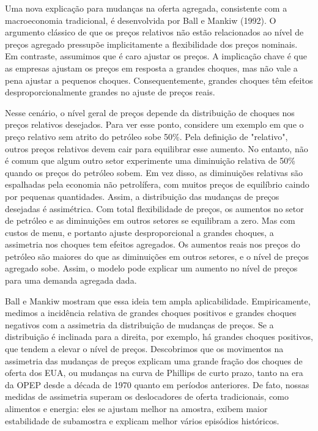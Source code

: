 \documentclass[12pt]{article}
\begin{document}
Uma nova explicação para mudanças na oferta agregada, consistente com a macroeconomia tradicional, é desenvolvida por Ball e Mankiw (1992). O argumento clássico de que os preços relativos não estão relacionados ao nível de preços agregado pressupõe implicitamente a flexibilidade dos preços nominais. Em contraste, assumimos que é caro ajustar os preços. A implicação chave é que as empresas ajustam os preços em resposta a grandes choques, mas não vale a pena ajustar a pequenos choques. Consequentemente, grandes choques têm efeitos desproporcionalmente grandes no ajuste de preços reais.

Nesse cenário, o nível geral de preços depende da distribuição de choques nos preços relativos desejados. Para ver esse ponto, considere um exemplo em que o preço relativo sem atrito do petróleo sobe 50\%. Pela definição de "relativo", outros preços relativos devem cair para equilibrar esse aumento. No entanto, não é comum que algum outro setor experimente uma diminuição relativa de 50\% quando os preços do petróleo sobem. Em vez disso, as diminuições relativas são espalhadas pela economia não petrolífera, com muitos preços de equilíbrio caindo por pequenas quantidades. Assim, a distribuição das mudanças de preços desejadas é assimétrica. Com total flexibilidade de preços, os aumentos no setor de petróleo e as diminuições em outros setores se equilibram a zero. Mas com custos de menu, e portanto ajuste desproporcional a grandes choques, a assimetria nos choques tem efeitos agregados. Os aumentos reais nos preços do petróleo são maiores do que as diminuições em outros setores, e o nível de preços agregado sobe. Assim, o modelo pode explicar um aumento no nível de preços para uma demanda agregada dada.

Ball e Mankiw mostram que essa ideia tem ampla aplicabilidade. Empiricamente, medimos a incidência relativa de grandes choques positivos e grandes choques negativos com a assimetria da distribuição de mudanças de preços. Se a distribuição é inclinada para a direita, por exemplo, há grandes choques positivos, que tendem a elevar o nível de preços. Descobrimos que os movimentos na assimetria das mudanças de preços explicam uma grande fração dos choques de oferta dos EUA, ou mudanças na curva de Phillips de curto prazo, tanto na era da OPEP desde a década de 1970 quanto em períodos anteriores. De fato, nossas medidas de assimetria superam os deslocadores de oferta tradicionais, como alimentos e energia: eles se ajustam melhor na amostra, exibem maior estabilidade de subamostra e explicam melhor vários episódios históricos.
\end{document}
